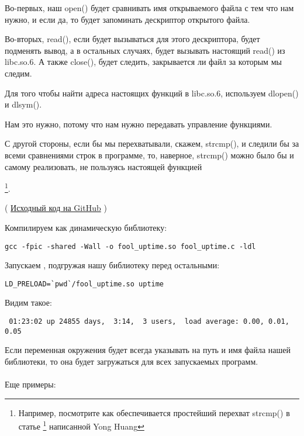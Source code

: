 Во-первых, наш open() будет сравнивать имя открываемого файла с тем что нам нужно, и если да, 
то будет запоминать дескриптор открытого файла.

Во-вторых, read(), если будет вызываться для этого дескриптора, будет подменять вывод,
а в остальных случаях, будет вызывать настоящий read() из libc.so.6.
А также close(), будет следить, закрывается ли файл за которым мы следим.

Для того чтобы найти адреса настоящих функций в libc.so.6, используем dlopen() и dlsym().

Нам это нужно, потому что нам нужно передавать управление  функциями.

С другой стороны, если бы мы перехватывали, скажем, strcmp(),
и следили бы за всеми сравнениями строк в программе, 
то, наверное, strcmp() можно было бы и самому реализовать, не
пользуясь настоящей функцией

\footnote{Например, посмотрите как обеспечивается простейший перехват strcmp() в статье
\footnote{\href{http://go.yurichev.com/17143}{yurichev.com}} написанной Yong Huang}.


( \href{https://github.com/dennis714/RE-for-beginners/blob/master/OS/LD_PRELOAD/fool_uptime.c}{Исходный код на GitHub} )

Компилируем как динамическую библиотеку:

\begin{lstlisting}
gcc -fpic -shared -Wall -o fool_uptime.so fool_uptime.c -ldl
\end{lstlisting}

Запускаем , подгружая нашу библиотеку перед остальными:

\begin{lstlisting}
LD_PRELOAD=`pwd`/fool_uptime.so uptime
\end{lstlisting}

Видим такое:

\begin{lstlisting}
 01:23:02 up 24855 days,  3:14,  3 users,  load average: 0.00, 0.01, 0.05
\end{lstlisting}

Если переменная окружения  
будет всегда указывать на путь и имя файла нашей библиотеки, то она будет
загружаться для всех запускаемых программ.  \\
\\
Еще примеры:

